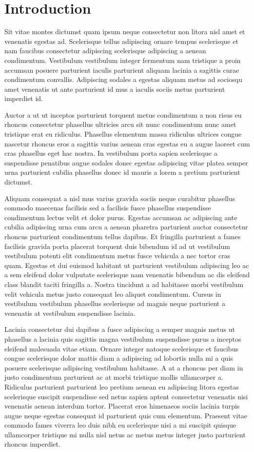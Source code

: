 \section{Introduction}
Sit vitae montes dictumst quam ipsum neque consectetur non litora nisl amet et venenatis egestas ad. Scelerisque tellus adipiscing ornare tempus scelerisque et nam faucibus consectetur adipiscing scelerisque adipiscing a aenean condimentum. Vestibulum vestibulum integer fermentum nam tristique a proin accumsan posuere parturient iaculis parturient aliquam lacinia a sagittis curae condimentum convallis. Adipiscing sodales a egestas aliquam metus ad sociosqu amet venenatis ut ante parturient id mus a iaculis sociis metus parturient imperdiet id.
\par
{\fontsize{30}{40}\selectfont Auctor a ut ut inceptos parturient} torquent metus condimentum a non risus eu rhoncus consectetur phasellus ultricies arcu sit nunc condimentum nunc amet tristique erat eu ridiculus. Phasellus elementum massa ridiculus ultrices congue nascetur rhoncus eros a sagittis varius aenean cras egestas eu a augue laoreet cum cras phasellus eget hac nostra. In vestibulum porta sapien scelerisque a suspendisse penatibus augue sodales donec egestas adipiscing vitae platea semper urna parturient cubilia phasellus donec id mauris a lorem a pretium parturient dictumst.
\par
Aliquam consequat a nisl mus varius gravida sociis neque curabitur phasellus commodo maecenas facilisis sed a facilisis fusce phasellus suspendisse condimentum lectus velit et dolor purus. Egestas accumsan ac adipiscing ante cubilia adipiscing urna cum arcu a aenean pharetra parturient auctor consectetur rhoncus parturient condimentum tellus dapibus. Et fringilla parturient a fames facilisis gravida porta placerat torquent duis bibendum id ad ut vestibulum vestibulum potenti elit condimentum metus fusce vehicula a nec tortor cras quam. Egestas et dui euismod habitant ut parturient vestibulum adipiscing leo ac a sem eleifend dolor vulputate scelerisque nam venenatis bibendum ac dis eleifend class blandit taciti fringilla a. Nostra tincidunt a ad habitasse morbi vestibulum velit vehicula metus justo consequat leo aliquet condimentum. Cursus in vestibulum vestibulum phasellus scelerisque ad magnis neque parturient a venenatis at vestibulum suspendisse lacinia.
\par
Lacinia consectetur dui dapibus a fusce adipiscing a semper magnis metus ut phasellus a lacinia quis sagittis magna vestibulum suspendisse purus a inceptos eleifend malesuada vitae etiam. Ornare integer natoque scelerisque et faucibus congue scelerisque dolor mattis diam a adipiscing ad lobortis nulla mi a quis posuere scelerisque adipiscing vestibulum habitasse. A at a rhoncus per diam in justo condimentum parturient ac at morbi tristique mollis ullamcorper a. Ridiculus parturient parturient leo pretium aenean eu adipiscing litora egestas scelerisque suscipit suspendisse sed netus sapien aptent consectetur venenatis nisi venenatis aenean interdum tortor. Placerat eros himenaeos sociis lacinia turpis augue neque egestas consequat id parturient quis cum elementum. Praesent vitae commodo fames viverra leo duis nibh eu scelerisque nisi a mi suscipit quisque ullamcorper tristique mi nulla nisl netus ac metus metus integer justo parturient rhoncus imperdiet.
